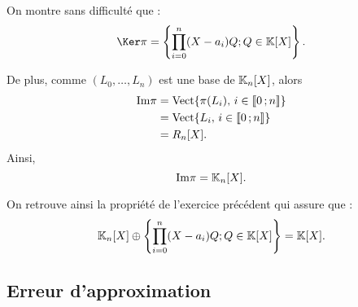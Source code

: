\begin{remarque}
On montre sans difficulté que :
\[
\Ker \pi = \left\{ \prod_{i=0}^n (X - a_i) Q ; Q \in \K[X] \right\}.
\]

De plus, comme $(L_0,\ldots,L_n)$ est une base de $\mathbb{K}_n[X]$, alors
\begin{align*}
\mathrm{Im} \pi &= \mathrm{Vect}\{\pi(L_i),\, i \in \llbracket 0\,; n \rrbracket\} \\
&= \mathrm{Vect}\{L_i,\, i \in \llbracket 0\,; n \rrbracket\} \\
&= R_n[X].
\end{align*}
Ainsi,
\[
\mathrm{Im} \pi = \mathbb{K}_n[X].
\]

On retrouve ainsi la propriété de l'exercice précédent qui assure que :
\[
\mathbb{K}_n[X] \oplus \left\{ \prod_{i=0}^n (X - a_i) Q ; Q \in \mathbb{K}[X] \right\} = \mathbb{K}[X].
\]
\end{remarque}

\subsection{Erreur d'approximation}

